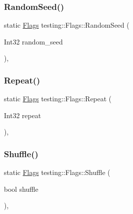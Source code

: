 \mbox{\label{structtesting_1_1Flags_a695cd8b8ab44df5eaa371bacded78c05}} 
\subsubsection{\texorpdfstring{RandomSeed()}{RandomSeed()}}
{\footnotesize\ttfamily static \mbox{\hyperlink{structtesting_1_1Flags}{Flags}} testing\+::\+Flags\+::\+Random\+Seed (\begin{DoxyParamCaption}\item[{Int32}]{random\+\_\+seed }\end{DoxyParamCaption})\hspace{0.3cm}{\ttfamily [inline]}, {\ttfamily [static]}}

\mbox{\label{structtesting_1_1Flags_a19d47e87d77a18ef4fa8a85b74e25956}} 
\subsubsection{\texorpdfstring{Repeat()}{Repeat()}}
{\footnotesize\ttfamily static \mbox{\hyperlink{structtesting_1_1Flags}{Flags}} testing\+::\+Flags\+::\+Repeat (\begin{DoxyParamCaption}\item[{Int32}]{repeat }\end{DoxyParamCaption})\hspace{0.3cm}{\ttfamily [inline]}, {\ttfamily [static]}}

\mbox{\label{structtesting_1_1Flags_a19ddbbaed61bda44a1940333b7c5a469}} 
\subsubsection{\texorpdfstring{Shuffle()}{Shuffle()}}
{\footnotesize\ttfamily static \mbox{\hyperlink{structtesting_1_1Flags}{Flags}} testing\+::\+Flags\+::\+Shuffle (\begin{DoxyParamCaption}\item[{bool}]{shuffle }\end{DoxyParamCaption})\hspace{0.3cm}{\ttfamily [inline]}, {\ttfamily [static]}}

